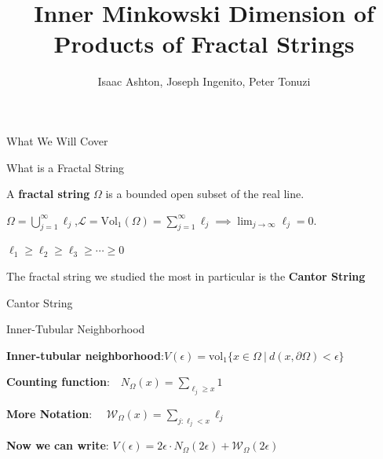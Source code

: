 \documentclass{if-beamer}
\title[]{Inner Minkowski Dimension of Products of Fractal Strings}
\subtitle{}
\author{Isaac Ashton, Joseph Ingenito, Peter Tonuzi}
\institute[]{The College of New Jersey}
\date{}
\newcommand{\SL}{\mathcal{L}}
\newcommand{\Om}{\Omega}
\newcommand{\W}{\mathcal{W}}
\begin{document}
\begin{frame}
  \titlepage
\end{frame}



\begin{frame}{What We Will Cover}

\end{frame}



\begin{frame}{What is a Fractal String}

\begin{definition}
A {\bf fractal string} $\Om$ is a bounded open subset of the real line.
\end{definition}

\pause
\vspace{.2 in}

$\Omega = \displaystyle\bigcup_{j = 1}^\infty \ell_j$,\qquad $\displaystyle \SL = \text{Vol}_1\left(\Omega\right) = \sum_{j = 1}^\infty \ell_j \implies \lim_{j \to \infty} \ell_j = 0$.

\pause
\vspace{.2 in}

$\ell_1 \geq \ell_2 \geq \ell_3 \geq \cdots \geq 0$

\pause
\vspace{.2 in}

The fractal string we studied the most in particular is the {\bf Cantor String}

\end{frame}



\begin{frame}{Cantor String}
	\begin{center}
	\end{center}
\end{frame}



\begin{frame}{Inner-Tubular Neighborhood}

\begin{definition}
{\bf Inner-tubular neighborhood}:\quad $V(\epsilon) = \text{vol}_1\{x \in \Omega\ |\ d(x,\partial\Omega) < \epsilon\}$
\end{definition}

\pause
\vspace{.2 in}

{\bf Counting function}:$\displaystyle \quad N_{\Omega}(x) = \sum_{\ell_j \geq x}1$

\vspace{.2 in}

{\bf More Notation}: $\displaystyle \quad \W_\Om(x) = \sum_{j:\ell_j < x}{\ell_j}$

\vspace{.2 in}

{\bf Now we can write}: $V(\epsilon) = 2\epsilon \cdot N_\Om\left(2\epsilon\right) + \W_\Om\left(2\epsilon\right)$

\end{frame}
\end{document}
